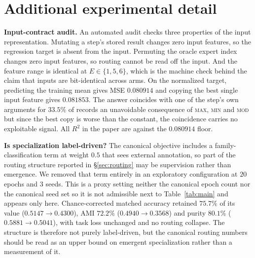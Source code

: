 \documentclass{article}
\begin{document}
\newpage
\appendix

\section{Additional experimental detail}
\label{app:detail}

\textbf{Input-contract audit.} An automated audit checks three properties of
the input representation. Mutating a step's stored result changes zero input
features, so the regression target is absent from the input. Permuting the
oracle expert index changes zero input features, so routing cannot be read off
the input. And the feature range is identical at $E \in \{1,5,6\}$, which is
the machine check behind the claim that inputs are bit-identical across arms.
On the normalized target, predicting the training mean gives MSE $0.080914$ and
copying the best single input feature gives $0.081853$. The answer coincides
with one of the step's own arguments for $33.5\%$ of records  an unavoidable
consequence of \textsc{max}, \textsc{min} and \textsc{mod}  but since the
best copy is worse than the constant, the coincidence carries no exploitable
signal. All $R^2$ in the paper are against the $0.080914$ floor.

\textbf{Is specialization label-driven?}
\label{app:famcls}
The canonical objective includes a family-classification term at weight $0.5$
that sees external annotation, so part of the routing structure reported in
\S\ref{sec:routing} may be supervision rather than emergence. We removed that
term entirely in an exploratory configuration at $20$ epochs and $3$ seeds.
This is a proxy setting  neither the canonical epoch count nor the canonical
seed set  so it is not admissible next to Table~\ref{tab:main} and appears
only here. Chance-corrected matched accuracy retained $75.7\%$ of its value
($0.5147 \to 0.4300$), AMI $72.2\%$ ($0.4940 \to 0.3568$) and purity $80.1\%$
($0.5881 \to 0.5041$), with task loss unchanged and no routing collapse. The
structure is therefore not purely label-driven, but the canonical routing
numbers should be read as an upper bound on emergent specialization rather than
a measurement of it.
\end{document}
